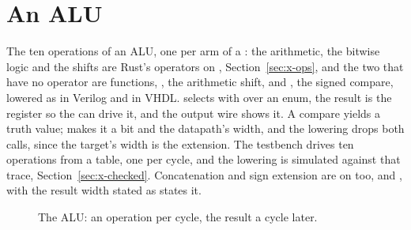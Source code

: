 \section{An ALU}
\label{sec:x-alu}

The ten operations of an ALU, one per arm of a : the
arithmetic, the bitwise logic and the shifts are Rust's operators on
, Section~\ref{sec:x-ops}, and the two that have no
operator are functions, , the arithmetic shift, and
, the signed compare, lowered as  in
Verilog and  in VHDL.  selects with 
over an enum, the result is the register  so the 
can drive it, and the output wire  shows it. A compare yields
a truth value;  makes it a bit and  the
datapath's width, and the lowering drops both calls, since the
target's width is the extension.
The testbench drives ten operations from a table, one per cycle, and
the lowering is simulated against that trace,
Section~\ref{sec:x-checked}. Concatenation and sign extension are on
 too,  and , with the
result width stated as  states it.

\begin{figure}[htbp]
\centering

\caption{The ALU: an operation per cycle, the result a cycle later.}
\label{fig:x-alu}
\end{figure}




